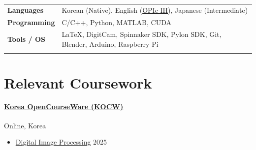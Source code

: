 \documentclass[a4paper,9pt]{extarticle}
\begin{document}
\begin{tabularx}{\textwidth}{@{}lX@{}}
\textbf{Languages}     & Korean (Native), English (\href{https://github.com/user-attachments/assets/f578b432-f7a8-410e-851c-852e9ae55378}{OPIc IH}), Japanese (Intermediate) \\ 
\textbf{Programming}   & C/C++, Python, MATLAB, CUDA \\
\textbf{Tools / OS}    & \LaTeX, DigitCam, Spinnaker SDK, Pylon SDK, Git, Blender, Arduino, Raspberry Pi  \\ \\
\end{tabularx}



\section*{Relevant Coursework}
\paragraph{\large{\href{https://www.kocw.net/home/index.do}{Korea OpenCourseWare (KOCW)}}} \hfill Online, Korea
\begin{itemize}
    \item \href{https://github.com/user-attachments/assets/d8024d63-359a-493b-9cb2-774e36a03f62}{Digital Image Processing}                                              \hfill 2025
\end{itemize}

\end{document}
